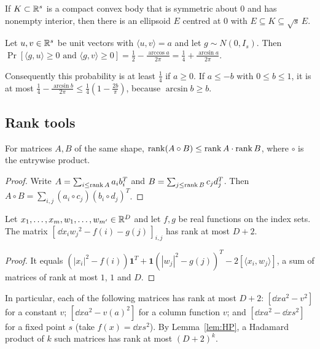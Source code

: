 \begin{theorem}\label{thm:John}
If $K\subset\mathbb{R}^s$ is a compact convex body that is symmetric about $0$ and has nonempty interior, then there is
an ellipsoid $E$ centred at $0$ with $E\subseteq K\subseteq\sqrt s\,E$.
\end{theorem}

\begin{theorem}\label{thm:Sheppard}
Let $u,v\in\mathbb{R}^s$ be unit vectors with $\langle u,v\rangle=a$ and let $g\sim N(0,I_s)$. Then
$\Pr[\langle g,u\rangle\ge0\text{ and }\langle g,v\rangle\ge0]=\tfrac12-\tfrac{\arccos a}{2\pi}
=\tfrac14+\tfrac{\arcsin a}{2\pi}$.
\end{theorem}
Consequently this probability is at least $\tfrac14$ if $a\ge 0$. If $a\le -b$ with $0\le b\le 1$, it is at
most $\tfrac14-\tfrac{\arcsin b}{2\pi}\le\tfrac14(1-\tfrac{2b}{\pi})$, because $\arcsin b\ge b$.

\subsection{Rank tools}

\begin{lemma}\label{lem:HP}
For matrices $A,B$ of the same shape, $\operatorname{rank}(A\circ B)\le\operatorname{rank} A\cdot\operatorname{rank} B$, where $\circ$ is the entrywise
product.
\end{lemma}
\begin{proof}
Write $A=\sum_{i\le\operatorname{rank} A}a_ib_i^{T}$ and $B=\sum_{j\le\operatorname{rank} B}c_jd_j^{T}$. Then
$A\circ B=\sum_{i,j}(a_i\circ c_j)(b_i\circ d_j)^{T}$.
\end{proof}

\begin{lemma}\label{lem:distrank}
Let $x_1,\dots,x_m,w_1,\dots,w_{m'}\in\mathbb{R}^D$ and let $f,g$ be real functions on the index sets. The matrix
$[\,\dd{x_i}{w_j}^2-f(i)-g(j)\,]_{i,j}$ has rank at most $D+2$.
\end{lemma}
\begin{proof}
It equals $(|x_i|^2-f(i))\mathbf 1^{T}+\mathbf 1(|w_j|^2-g(j))^{T}-2[\langle x_i,w_j\rangle]$, a sum of matrices of
rank at most $1$, $1$ and $D$.
\end{proof}
In particular, each of the following matrices has rank at most $D+2$: $[\dd xa^2-v^2]$ for a constant $v$;
$[\dd xa^2-v(a)^2]$ for a column function $v$; and $[\dd xa^2-\dd xs^2]$ for a fixed point $s$ (take
$f(x)=\dd xs^2$). By Lemma~\ref{lem:HP}, a Hadamard product of $k$ such matrices has rank at most $(D+2)^k$.


